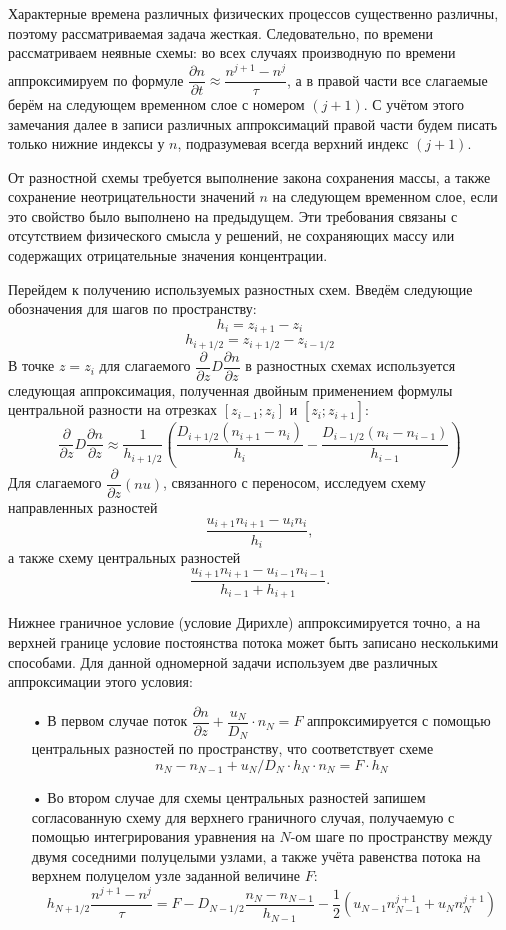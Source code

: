 \documentclass[14pt, a4paper, fleqn]{extarticle}
\begin{document}
\medskip 

Характерные времена различных физических процессов существенно различны, поэтому рассматриваемая задача жесткая. Следовательно, по времени рассматриваем неявные схемы: во всех случаях производную по времени аппроксимируем по формуле $\dfrac{\partial n}{\partial t}\approx \dfrac{n^{j+1}-n^j}{\tau}$, а в правой части все слагаемые берём на следующем временном слое с номером $(j+1)$. С учётом этого замечания далее в записи различных аппроксимаций правой части будем писать только нижние индексы у $n$, подразумевая всегда верхний индекс $(j+1)$.

От разностной схемы требуется выполнение закона сохранения массы, а также сохранение неотрицательности значений $n$ на следующем временном слое, если это свойство было выполнено на предыдущем. Эти требования связаны с отсутствием физического смысла у решений, не сохраняющих массу или содержащих отрицательные значения концентрации.

Перейдем к получению используемых разностных схем. Введём следующие обозначения для шагов по пространству: $$h_i = z_{i+1}-z_i$$ $$h_{i+1/2}=z_{i+1/2}-z_{i-1/2}$$
В точке $z=z_i$ для слагаемого $\dfrac{\partial}{\partial z}D\dfrac{\partial n}{\partial z}$ в разностных схемах используется следующая аппроксимация, полученная двойным применением формулы центральной разности на отрезках $[z_{i-1};z_i]$ и $[z_i; z_{i+1}]$: 
$$\dfrac{\partial}{\partial z}D\dfrac{\partial n}{\partial z} \approx \dfrac{1}{h_{i+1/2}}\left(\dfrac{D_{i+1/2}(n_{i+1}-n_i)}{h_i}-\dfrac{D_{i-1/2}(n_{i}-n_{i-1})}{h_{i-1}}\right)$$
Для слагаемого $\dfrac{\partial}{\partial z}(nu)$, связанного с переносом, исследуем схему направленных разностей $$\dfrac{u_{i+1}n_{i+1}-u_{i}n_{i}}{h_i},$$ а также схему центральных разностей $$\dfrac{u_{i+1}n_{i+1}-u_{i-1}n_{i-1}}{h_{i-1}+h_{i+1}}.$$

Нижнее граничное условие (условие Дирихле) аппроксимируется точно, а на верхней границе условие постоянства потока может быть записано несколькими способами. Для данной одномерной задачи используем две различных аппроксимации этого условия:

\begin{itemize}
\item[•] В первом случае поток $\dfrac{\partial n}{\partial z}+\dfrac{u_N}{D_N}\cdot n_N=F$ аппроксимируется с помощью центральных разностей по пространству, что соответствует схеме $$n_N-n_{N-1}+u_N/D_N\cdot h_N\cdot n_N = F\cdot h_N$$
\item[•] Во втором случае для схемы центральных разностей запишем согласованную схему для верхнего граничного случая, получаемую с помощью интегрирования уравнения на $N$-ом шаге по пространству между двумя соседними полуцелыми узлами, а также учёта равенства потока на верхнем полуцелом узле заданной величине $F$: $$h_{N+1/2}\dfrac{n^{j+1}-n^j}{\tau}= F - D_{N-1/2}\dfrac{n_N-n_{N-1}}{h_{N-1}}-\dfrac{1}{2}(u_{N-1}n_{N-1}^{j+1}+u_{N}n_{N}^{j+1})$$
\end{itemize}
\end{document}
